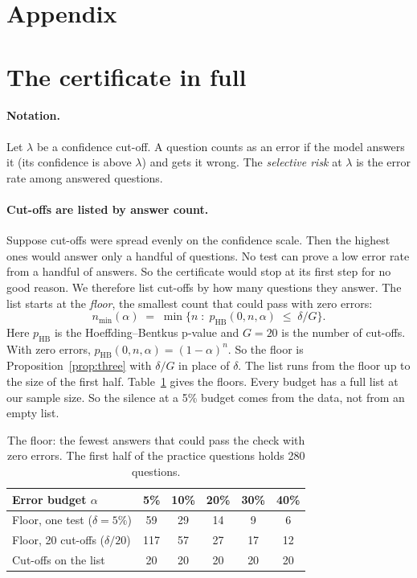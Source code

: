 \documentclass[11pt]{article}
\theoremstyle{plain}
\theoremstyle{definition}
\begin{document}
\section*{Appendix}

\section{The certificate in full}
\label{app:method}

\paragraph{Notation.} Let $\lambda$ be a confidence cut-off. A question counts as an error if the model answers it (its confidence is above $\lambda$) and gets it wrong. The \emph{selective risk} at $\lambda$ is the error rate among answered questions.

\paragraph{Cut-offs are listed by answer count.} Suppose cut-offs were spread evenly on the confidence scale. Then the highest ones would answer only a handful of questions. No test can prove a low error rate from a handful of answers. So the certificate would stop at its first step for no good reason. We therefore list cut-offs by how many questions they answer. The list starts at the \emph{floor}, the smallest count that could pass with zero errors:
\begin{equation}
n_{\min}(\alpha) \;=\; \min \Big\{ n \;:\; p_{\mathrm{HB}}(0, n, \alpha) \;\le\; \delta / G \Big\}.
\end{equation}
Here $p_{\mathrm{HB}}$ is the Hoeffding--Bentkus p-value \citep{bates2021distribution} and $G = 20$ is the number of cut-offs. With zero errors, $p_{\mathrm{HB}}(0, n, \alpha) = (1-\alpha)^n$. So the floor is Proposition~\ref{prop:three} with $\delta/G$ in place of $\delta$. The list runs from the floor up to the size of the first half. Table~\ref{tab:feasibility} gives the floors. Every budget has a full list at our sample size. So the silence at a 5\% budget comes from the data, not from an empty list.

\begin{table}[H]
\centering
\small
\caption{The floor: the fewest answers that could pass the check with zero errors. The first half of the practice questions holds 280 questions.}
\label{tab:feasibility}
\begin{tabular}{lccccc}
\toprule
Error budget $\alpha$ & 5\% & 10\% & 20\% & 30\% & 40\% \\
\midrule
Floor, one test ($\delta = 5\%$) & 59 & 29 & 14 & 9 & 6 \\
Floor, 20 cut-offs ($\delta/20$) & 117 & 57 & 27 & 17 & 12 \\
Cut-offs on the list & 20 & 20 & 20 & 20 & 20 \\
\bottomrule
\end{tabular}
\end{table}
\end{document}
